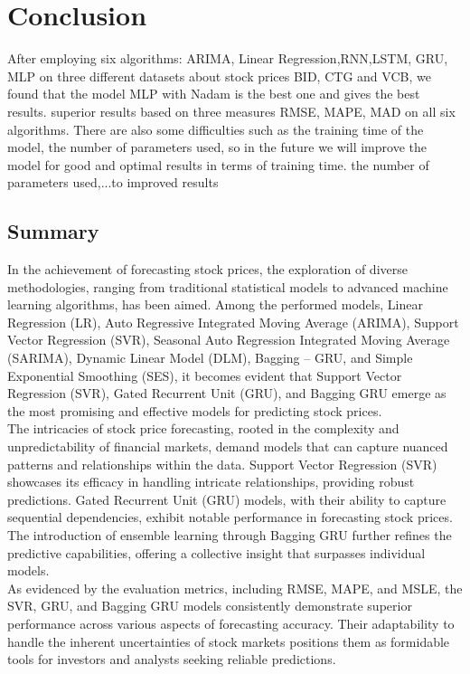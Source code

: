 \documentclass{ieeeojies}
\begin{document}
\section{Conclusion}
After employing six algorithms: ARIMA, Linear Regression,RNN,LSTM, GRU, MLP on three different datasets about stock prices BID, CTG and VCB, we found that the model MLP with Nadam is the best one and gives the best results. superior results based on three measures RMSE, MAPE, MAD on all six algorithms.  
There are also some difficulties such as the training time of 
the model, the number of parameters used, so in the future we 
will improve the model for good and optimal results in terms 
of training time. the number of parameters used,...to 
improved results
\subsection{Summary}
In the achievement of forecasting stock prices, the exploration of diverse methodologies, ranging from traditional statistical models to advanced machine learning algorithms, has been aimed. Among the performed models, Linear Regression (LR), Auto Regressive Integrated Moving Average (ARIMA), Support Vector Regression (SVR), Seasonal Auto Regression Integrated Moving Average (SARIMA), Dynamic Linear Model (DLM), Bagging – GRU, and Simple Exponential Smoothing (SES), it becomes evident that Support Vector Regression (SVR), Gated Recurrent Unit (GRU), and Bagging GRU emerge as the most promising and effective models for predicting stock prices.\\
The intricacies of stock price forecasting, rooted in the complexity and unpredictability of financial markets, demand models that can capture nuanced patterns and relationships within the data. Support Vector Regression (SVR) showcases its efficacy in handling intricate relationships, providing robust predictions. Gated Recurrent Unit (GRU) models, with their ability to capture sequential dependencies, exhibit notable performance in forecasting stock prices. The introduction of ensemble learning through Bagging GRU further refines the predictive capabilities, offering a collective insight that surpasses individual models.\\
As evidenced by the evaluation metrics, including RMSE, MAPE, and MSLE, the SVR, GRU, and Bagging GRU models consistently demonstrate superior performance across various aspects of forecasting accuracy. Their adaptability to handle the inherent uncertainties of stock markets positions them as formidable tools for investors and analysts seeking reliable predictions.
\end{document}

